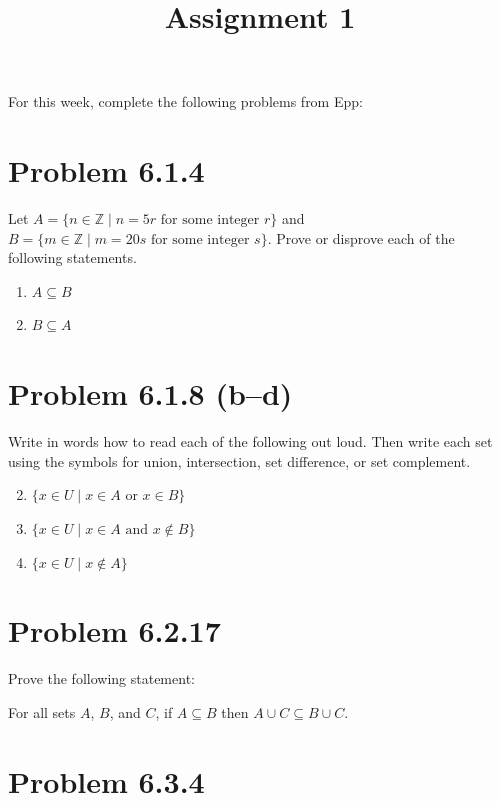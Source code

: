 \documentclass[11pt]{article}
\title{\vspace{-2em}Assignment 1\vspace{-1em}}
\author{}
\date{}
\begin{document}
\maketitle

\noindent For this week, complete the following problems from Epp:

\section*{Problem 6.1.4}

Let $A = \{n \in \mathbb{Z} \mid n = 5r \text{ for some integer } r\}$ and
$B = \{m \in \mathbb{Z} \mid m = 20s \text{ for some integer } s\}$.
Prove or disprove each of the following statements.

\begin{enumerate}[label=\alph*.]
    \item $A \subseteq B$
    \item $B \subseteq A$
\end{enumerate}

\section*{Problem 6.1.8 (b--d)}

Write in words how to read each of the following out loud. Then write each set using the symbols for union, intersection, set difference, or set complement.

\begin{enumerate}[label=\alph*.]
    \setcounter{enumi}{1}
    \item $\{x \in U \mid x \in A \text{ or } x \in B\}$
    \item $\{x \in U \mid x \in A \text{ and } x \notin B\}$
    \item $\{x \in U \mid x \notin A\}$
\end{enumerate}

\section*{Problem 6.2.17}

Prove the following statement:

For all sets $A$, $B$, and $C$, if $A \subseteq B$ then $A \cup C \subseteq B \cup C$.

\section*{Problem 6.3.4}
\end{document}
